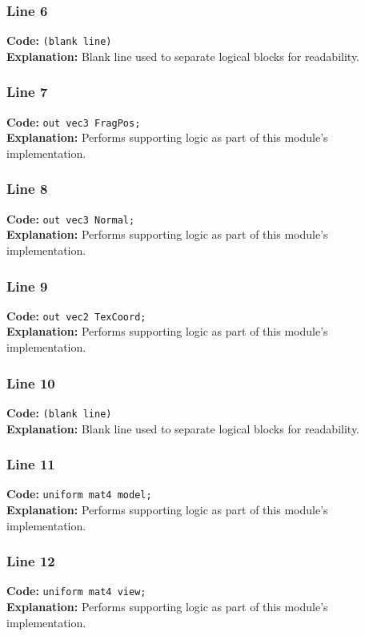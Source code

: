 \documentclass[11pt,a4paper]{article}
\begin{document}
\subsubsection*{Line 6}
\textbf{Code:} \texttt{(blank line)}\\
\textbf{Explanation:} Blank line used to separate logical blocks for readability.

\subsubsection*{Line 7}
\textbf{Code:} \verb|out vec3 FragPos;|\\
\textbf{Explanation:} Performs supporting logic as part of this module's implementation.

\subsubsection*{Line 8}
\textbf{Code:} \verb|out vec3 Normal;|\\
\textbf{Explanation:} Performs supporting logic as part of this module's implementation.

\subsubsection*{Line 9}
\textbf{Code:} \verb|out vec2 TexCoord;|\\
\textbf{Explanation:} Performs supporting logic as part of this module's implementation.

\subsubsection*{Line 10}
\textbf{Code:} \texttt{(blank line)}\\
\textbf{Explanation:} Blank line used to separate logical blocks for readability.

\subsubsection*{Line 11}
\textbf{Code:} \verb|uniform mat4 model;|\\
\textbf{Explanation:} Performs supporting logic as part of this module's implementation.

\subsubsection*{Line 12}
\textbf{Code:} \verb|uniform mat4 view;|\\
\textbf{Explanation:} Performs supporting logic as part of this module's implementation.
\end{document}
